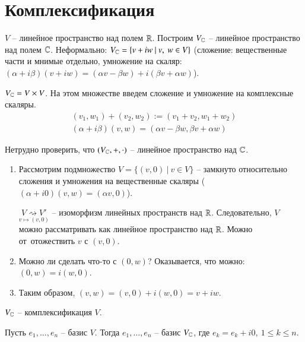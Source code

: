 \documentclass[main]{subfiles}
\begin{document}
\chapter{Комплексификация}


$V$ -- линейное пространство над полем $\mathbb{R}$. Построим $V_{\mathbb{C}}$ -- линейное пространство над
полем $\mathbb{C}$. Неформально: $V_{\mathbb{C}} = \{v +  iw \ | \ v, \ w \in V\}$ (сложение: вещественные части и мнимые отдельно, 
умножение на скаляр: $(\alpha + i\beta) (v + iw) = (\alpha v - \beta w) + i(\beta v + \alpha w)$).

$V_{\mathbb{C}} = V\times V$. На этом множестве введем сложение и умножение на комплексные скаляры.
\begin{gather*}
    (v_1,w_1) + (v_2, w_2) := (v_1 + v_2, w_1 + w_2)  \\
    (\alpha + i\beta) (v, w) = (\alpha v - \beta w, \beta v + \alpha w)
\end{gather*}

Нетрудно проверить, что $(V_{\mathbb{C}}, +, \cdot)$ -- линейное пространство над $\mathbb{C}$.

\begin{enumerate}
    \item Рассмотрим подмножество $V = \{(v, 0) \ | \ v \in V\}$ -- 
    замкнуто относительно сложения и умножения на вещественные скаляры 
    ($(\alpha + i0)(v, w) = (\alpha v, 0)$).
    
    $\underset{v \mapsto (v, 0)}{V \rightsquigarrow V'}$ -- изоморфизм линейных пространств над $\mathbb{R}$. Следовательно, 
    $V$ можно рассматривать как линейное пространство над $\mathbb{R}$. Можно от отожествить $v$ с $(v, 0)$.
    \item Можно ли сделать что-то с $(0, w)$? Оказывается, что можно: $(0, w) = i(w, 0)$.
    \item Таким образом, $(v, w) = (v, 0) + i(w, 0) = v +iw$.
\end{enumerate}

$V_{\mathbb{C}}$ -- комплексификация $V$.

\begin{corollary}
    Пусть $e_1, \ldots, e_n$ -- базис $V$. Тогда $e_1, \ldots, e_n$ -- базис $V_{\mathbb{C}}$, где $e_k = e_k + i0, \ 1 \leqslant k\leqslant n $.
\end{corollary}
\end{document}
